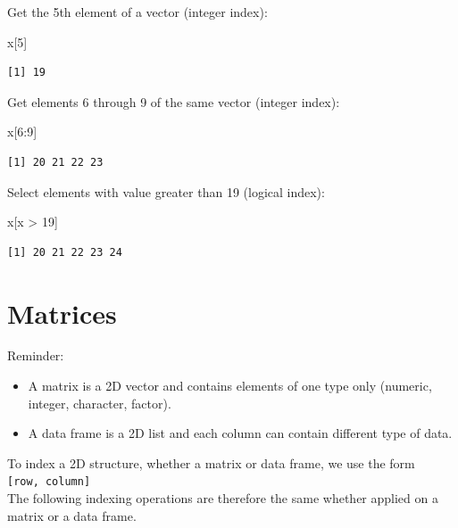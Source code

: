 \documentclass[
]{book}
\newenvironment{Shaded}{\begin{snugshade}}{\end{snugshade}}
\newcommand{\DecValTok}[1]{\textcolor[rgb]{0.00,0.00,0.81}{#1}}
\newcommand{\NormalTok}[1]{#1}
\newcommand{\SpecialCharTok}[1]{\textcolor[rgb]{0.00,0.00,0.00}{#1}}
\providecommand{\tightlist}{%
  \setlength{\itemsep}{0pt}\setlength{\parskip}{0pt}}
\begin{document}
Get the 5th element of a vector (integer index):

\begin{Shaded}
\begin{Highlighting}[]
\NormalTok{x[}\DecValTok{5}\NormalTok{]}
\end{Highlighting}
\end{Shaded}

\begin{verbatim}
[1] 19
\end{verbatim}

Get elements 6 through 9 of the same vector (integer index):

\begin{Shaded}
\begin{Highlighting}[]
\NormalTok{x[}\DecValTok{6}\SpecialCharTok{:}\DecValTok{9}\NormalTok{]}
\end{Highlighting}
\end{Shaded}

\begin{verbatim}
[1] 20 21 22 23
\end{verbatim}

Select elements with value greater than 19 (logical index):

\begin{Shaded}
\begin{Highlighting}[]
\NormalTok{x[x }\SpecialCharTok{\textgreater{}} \DecValTok{19}\NormalTok{]}
\end{Highlighting}
\end{Shaded}

\begin{verbatim}
[1] 20 21 22 23 24
\end{verbatim}

\hypertarget{indexmatrices}{%
\section{Matrices}\label{indexmatrices}}

Reminder:

\begin{itemize}
\tightlist
\item
  A matrix is a 2D vector and contains elements of one type only (numeric, integer, character, factor).\\
\item
  A data frame is a 2D list and each column can contain different type of data.
\end{itemize}

To index a 2D structure, whether a matrix or data frame, we use the form \texttt{{[}row,\ column{]}}\\
The following indexing operations are therefore the same whether applied on a matrix or a data frame.
\end{document}
